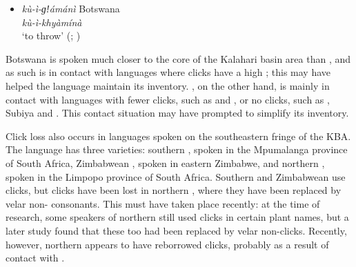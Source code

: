 \documentclass[output=paper
,newtxmath
,modfonts
,nonflat]{langsci/langscibook}
\begin{document}
\begin{itemize}
\item  
\textit{kù-ì-ɡǃ}\textit{ámánì}    Botswana \\
\textit{kù-ì-khyàmínà}    \\
‘to throw’ (\citealt[43]{Seidel2008}; \citealt[32]{Sommer1992})
 \end{itemize}

Botswana  is spoken much closer to the core of the Kalahari basin area than , and as such is in contact with languages where clicks have a high ; this may have helped the language maintain its  inventory. , on the other hand, is mainly in contact with  languages with fewer clicks, such as  and , or no clicks, such as , Subiya and . This contact situation may have prompted  to simplify its  inventory.

Click loss also occurs in   languages spoken on the southeastern fringe of the KBA. The  language  has three varieties: southern , spoken in the Mpumalanga province of South Africa, Zimbabwean , spoken in eastern Zimbabwe, and northern , spoken in the Limpopo province of South Africa. Southern and Zimbabwean  use clicks, but clicks have been lost in northern , where they have been replaced by velar non- consonants. This  must have taken place recently: at the time of  research, some speakers of northern  still used clicks in certain plant names, but a later study \citep{Skhosana2009} found that these too had been replaced by velar non-clicks. Recently, however, northern  appears to have reborrowed clicks, probably as a result of contact with  \citep{schulzlaine2016}. 
\end{document}
